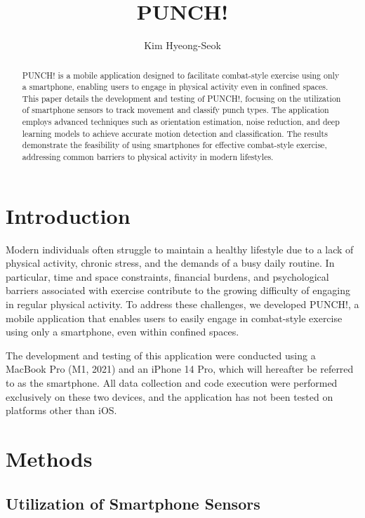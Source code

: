 \documentclass{article}
\title{\textbf{PUNCH!}}
\author{Kim Hyeong-Seok}
\begin{document}
    \maketitle
    \begin{abstract}
        PUNCH! is a mobile application designed to facilitate combat-style
        exercise using only a smartphone, enabling users to engage in physical activity
        even in confined spaces. This paper details the development and testing
        of PUNCH!, focusing on the utilization of smartphone sensors to track
        movement and classify punch types. The application employs advanced techniques
        such as orientation estimation, noise reduction, and deep learning models
        to achieve accurate motion detection and classification. The results
        demonstrate the feasibility of using smartphones for effective combat-style
        exercise, addressing common barriers to physical activity in modern lifestyles.
    \end{abstract}

    \section{Introduction}
    Modern individuals often struggle to maintain a healthy lifestyle due to a
    lack of physical activity, chronic stress, and the demands of a busy daily
    routine. In particular, time and space constraints, financial burdens, and
    psychological barriers associated with exercise contribute to the growing
    difficulty of engaging in regular physical activity. To address these challenges,
    we developed PUNCH!, a mobile application that enables users to easily
    engage in combat-style exercise using only a smartphone, even within confined
    spaces.

    The development and testing of this application were conducted using a MacBook
    Pro (M1, 2021) and an iPhone 14 Pro, which will hereafter be referred to as the
    smartphone. All data collection and code execution were performed
    exclusively on these two devices, and the application has not been tested on
    platforms other than iOS.
    \section{Methods}
    \subsection{Utilization of Smartphone Sensors}
\end{document}
